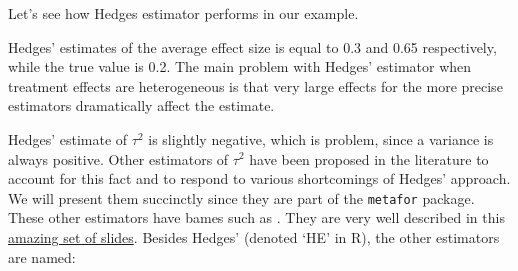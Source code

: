 \documentclass[]{book}
\newenvironment{Shaded}{\begin{snugshade}}{\end{snugshade}}
\newcommand{\KeywordTok}[1]{\textcolor[rgb]{0.13,0.29,0.53}{\textbf{#1}}}
\newcommand{\DecValTok}[1]{\textcolor[rgb]{0.00,0.00,0.81}{#1}}
\newcommand{\FloatTok}[1]{\textcolor[rgb]{0.00,0.00,0.81}{#1}}
\newcommand{\StringTok}[1]{\textcolor[rgb]{0.31,0.60,0.02}{#1}}
\newcommand{\ControlFlowTok}[1]{\textcolor[rgb]{0.13,0.29,0.53}{\textbf{#1}}}
\newcommand{\OperatorTok}[1]{\textcolor[rgb]{0.81,0.36,0.00}{\textbf{#1}}}
\newcommand{\NormalTok}[1]{#1}
\theoremstyle{definition}
\theoremstyle{definition}
\theoremstyle{definition}
\theoremstyle{remark}
\let\BeginKnitrBlock\begin \let\EndKnitrBlock\end
\begin{document}
\begin{Shaded}
\end{Shaded}

\BeginKnitrBlock{example}
\protect\hypertarget{exm:unnamed-chunk-149}{}{\label{exm:unnamed-chunk-149}
}Let's see how Hedges estimator performs in our example.
\EndKnitrBlock{example} Hedges' estimates of the average effect size is
equal to 0.3 and 0.65 respectively, while the true value is 0.2. The
main problem with Hedges' estimator when treatment effects are
heterogeneous is that very large effects for the more precise estimators
dramatically affect the estimate.

\BeginKnitrBlock{remark}
\iffalse{} {Remark. } \fi{}Hedges' estimate of \(\tau^2\) is slightly
negative, which is problem, since a variance is always positive. Other
estimators of \(\tau^2\) have been proposed in the literature to account
for this fact and to respond to various shortcomings of Hedges'
approach. We will present them succinctly since they are part of the
\texttt{metafor} package. These other estimators have bames such as .
They are very well described in this
\href{http://www.edii.uclm.es/~useR-2013/Tutorials/kovalchik/kovalchik_meta_tutorial.pdf}{amazing
set of slides}. Besides Hedges' (denoted `HE' in R), the other
estimators are named:
\EndKnitrBlock{remark}
\end{document}
